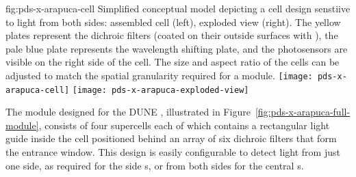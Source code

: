  \begin{dunefigure}{fig:pds-x-arapuca-cell}
{Simplified conceptual model depicting a  cell design senstiive to light from both sides: assembled cell (left),  exploded view (right). The yellow plates represent the dichroic filters (coated on their outside surfaces with  ), the pale blue plate represents the wavelength shifting plate, and the photosensors are visible on the right side of the cell. The size and aspect ratio of the cells can be adjusted to match the spatial granularity required for a  module. 
} 
  \texttt{[image: pds-x-arapuca-cell]}
  \texttt{[image: pds-x-arapuca-exploded-view]}
\end{dunefigure}

The   module designed for the DUNE , illustrated in Figure~\ref{fig:pds-x-arapuca-full-module}, consists of four supercells each of which contains a rectangular 
light guide inside the cell positioned behind an array of six dichroic filters that form the entrance window.  
This design is easily configurable to detect light from just one side, as required for the side s, or from both sides for the central s. 

